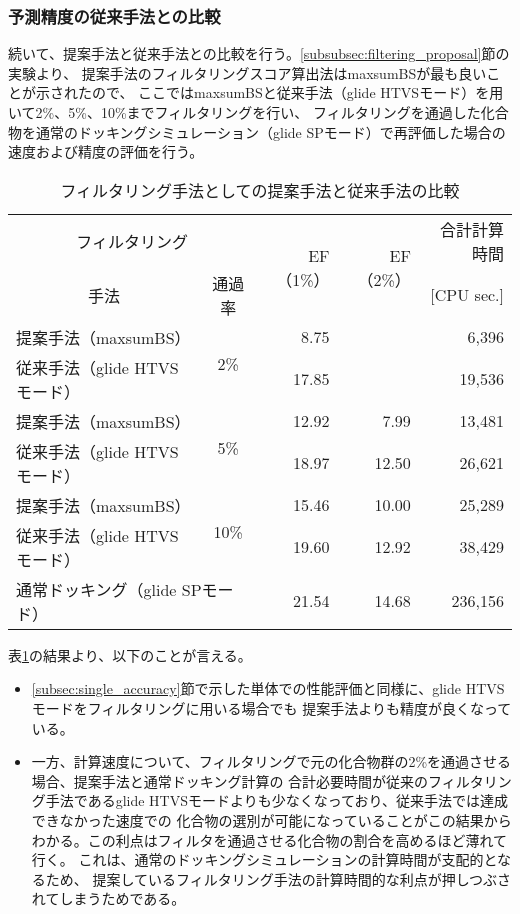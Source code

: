 \subsubsection{予測精度の従来手法との比較}\label{subsubsec:filtering_comparison}
続いて、提案手法と従来手法との比較を行う。\ref{subsubsec:filtering_proposal}節の実験より、
提案手法のフィルタリングスコア算出法はmaxsumBSが最も良いことが示されたので、
ここではmaxsumBSと従来手法（glide HTVSモード）を用いて2\%、5\%、10\%までフィルタリングを行い、
フィルタリングを通過した化合物を通常のドッキングシミュレーション（glide SPモード）で再評価した場合の
速度および精度の評価を行う。

\begin{table}[htb] \centering
	\caption{フィルタリング手法としての提案手法と従来手法の比較}
	\label{table:filtering_proposal_glide}
	\begin{tabular}{lc|rr|r}
	\hline
	\multicolumn{2}{c|}{フィルタリング}					&\multirow{2}{*}{EF（1\%）}	&\multirow{2}{*}{EF（2\%）}	&合計計算時間	\\
	\multicolumn{1}{c}{手法}		&通過率				&						&						&[CPU sec.]		\\ \hline
	提案手法（maxsumBS）		&\multirow{2}{*}{2\%}	&8.75					&\textendash				&6,396			\\
	従来手法（glide HTVSモード）	&					&17.85					&\textendash				&19,536			\\
	提案手法（maxsumBS）		&\multirow{2}{*}{5\%}	&12.92					&7.99					&13,481			\\
	従来手法（glide HTVSモード）	&					&18.97					&12.50					&26,621			\\
	提案手法（maxsumBS）		&\multirow{2}{*}{10\%}	&15.46					&10.00					&25,289			\\
	従来手法（glide HTVSモード）	&					&19.60					&12.92					&38,429			\\ \hline
	\multicolumn{2}{l|}{通常ドッキング（glide SPモード）}	&21.54					&14.68					&236,156			\\ \hline
	\end{tabular}
\end{table}

表\ref{table:filtering_proposal_glide}の結果より、以下のことが言える。
\begin{itemize}
\item \ref{subsec:single_accuracy}節で示した単体での性能評価と同様に、glide HTVSモードをフィルタリングに用いる場合でも
	提案手法よりも精度が良くなっている。
\item 一方、計算速度について、フィルタリングで元の化合物群の2\%を通過させる場合、提案手法と通常ドッキング計算の
	合計必要時間が従来のフィルタリング手法であるglide HTVSモードよりも少なくなっており、従来手法では達成できなかった速度での
	化合物の選別が可能になっていることがこの結果からわかる。この利点はフィルタを通過させる化合物の割合を高めるほど薄れて行く。
	これは、通常のドッキングシミュレーションの計算時間が支配的となるため、
	提案しているフィルタリング手法の計算時間的な利点が押しつぶされてしまうためである。
\end{itemize}